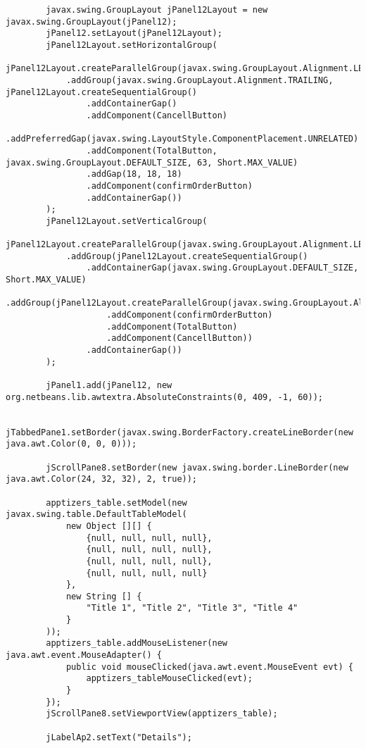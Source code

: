 \documentclass[12pt,a4paper]{article}
\begin{document}
\begin{lstlisting}
        javax.swing.GroupLayout jPanel12Layout = new javax.swing.GroupLayout(jPanel12);
        jPanel12.setLayout(jPanel12Layout);
        jPanel12Layout.setHorizontalGroup(
            jPanel12Layout.createParallelGroup(javax.swing.GroupLayout.Alignment.LEADING)
            .addGroup(javax.swing.GroupLayout.Alignment.TRAILING, jPanel12Layout.createSequentialGroup()
                .addContainerGap()
                .addComponent(CancellButton)
                .addPreferredGap(javax.swing.LayoutStyle.ComponentPlacement.UNRELATED)
                .addComponent(TotalButton, javax.swing.GroupLayout.DEFAULT_SIZE, 63, Short.MAX_VALUE)
                .addGap(18, 18, 18)
                .addComponent(confirmOrderButton)
                .addContainerGap())
        );
        jPanel12Layout.setVerticalGroup(
            jPanel12Layout.createParallelGroup(javax.swing.GroupLayout.Alignment.LEADING)
            .addGroup(jPanel12Layout.createSequentialGroup()
                .addContainerGap(javax.swing.GroupLayout.DEFAULT_SIZE, Short.MAX_VALUE)
                .addGroup(jPanel12Layout.createParallelGroup(javax.swing.GroupLayout.Alignment.BASELINE)
                    .addComponent(confirmOrderButton)
                    .addComponent(TotalButton)
                    .addComponent(CancellButton))
                .addContainerGap())
        );

        jPanel1.add(jPanel12, new org.netbeans.lib.awtextra.AbsoluteConstraints(0, 409, -1, 60));

        jTabbedPane1.setBorder(javax.swing.BorderFactory.createLineBorder(new java.awt.Color(0, 0, 0)));

        jScrollPane8.setBorder(new javax.swing.border.LineBorder(new java.awt.Color(24, 32, 32), 2, true));

        apptizers_table.setModel(new javax.swing.table.DefaultTableModel(
            new Object [][] {
                {null, null, null, null},
                {null, null, null, null},
                {null, null, null, null},
                {null, null, null, null}
            },
            new String [] {
                "Title 1", "Title 2", "Title 3", "Title 4"
            }
        ));
        apptizers_table.addMouseListener(new java.awt.event.MouseAdapter() {
            public void mouseClicked(java.awt.event.MouseEvent evt) {
                apptizers_tableMouseClicked(evt);
            }
        });
        jScrollPane8.setViewportView(apptizers_table);

        jLabelAp2.setText("Details");


\end{lstlisting}
\end{document}
